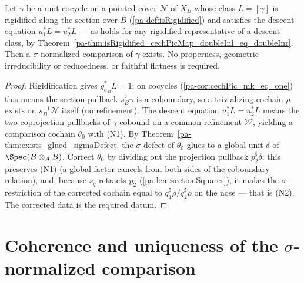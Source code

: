 \begin{theorem}
  \label{pa-thm:exists_normalizedCechComparison}
  \leanok

  Let \(\gamma\) be a unit cocycle on a pointed cover \(\mathcal N\) of \(X_B\) whose class \(L =
  [\gamma]\) is rigidified along the section over \(B\) (\ref{pa-def:isRigidified}) and satisfies the
  descent equation \(u_1^{*} L = u_2^{*} L\) — as holds for any rigidified representative of a
  descent class, by Theorem~\ref{pa-thm:isRigidified_cechPicMap_doubleInl_eq_doubleInr}. Then a
  \(\sigma\)-normalized comparison of \(\gamma\) exists. No properness, geometric
  irreducibility or reducedness, or faithful flatness is required.
\end{theorem}
\begin{proof}
  \leanok
  Rigidification gives \(g_{\sigma_B}^{*} L = 1\); on cocycles (\ref{pa-cor:cechPic_mk_eq_one}) this
  means the section-pullback \(s_B^{\sharp}\gamma\) is a coboundary, so a trivializing cochain
  \(\rho\) exists on \(s_B^{-1}\mathcal N\) itself (no refinement). The descent equation
  \(u_1^{*} L = u_2^{*} L\) means the two coprojection pullbacks of \(\gamma\) cobound on a common
  refinement \(\mathcal W\), yielding a comparison cochain \(\theta_0\) with (N1). By
  Theorem~\ref{pa-thm:exists_glued_sigmaDefect} the \(\sigma\)-defect of \(\theta_0\) glues to a
  global unit \(\delta\) of \(\Spec(B \otimes_A B)\). Correct \(\theta_0\) by dividing out the
  projection pullback \(p_2^{\sharp}\delta\): this preserves (N1) (a global factor cancels from
  both sides of the coboundary relation), and, because \(s_q\) retracts \(p_2\)
  (\ref{pa-lem:sectionSquares}), it makes the \(\sigma\)-restriction of the corrected cochain equal
  to \(q_1^{\sharp}\rho / q_2^{\sharp}\rho\) on the nose — that is (N2). The corrected data is the
  required datum.
\end{proof}

\section{Coherence and uniqueness of the
  \texorpdfstring{\(\sigma\)}{sigma}-normalized comparison}
\label{pa-sec:comparisonCoherence}

